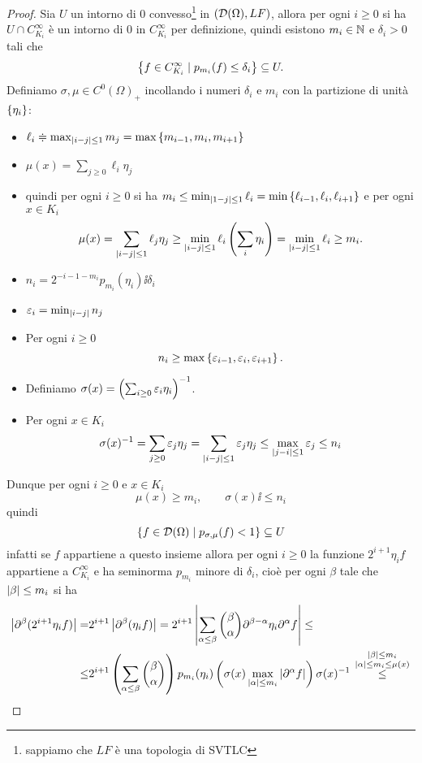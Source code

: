\begin{proof}
Sia $U$ un intorno di $0$ convesso\footnote{sappiamo che $LF$ \`e una topologia di SVTLC} in $(\mathcal{D}(\Omega),LF)$, allora per ogni $i\geq 0$ si ha $U\cap C_{K_i}^\infty$ \`e un intorno di $0$ in $C^\infty_{K_i}$ per definizione, quindi esistono $m_i\in\mathbb{N}$ e $\delta_i>0$ tali che
\[\left\{{f\in C^\infty_{K_i}\mid p_{m_i}(f)\leq \delta_i}\right\}\subseteq U.\]
Definiamo $\sigma,\mu\in C^0(\Omega)_+$ incollando i numeri $\delta_i$ e $m_i$ con la partizione di unit\`a $\left\{{\eta_i}\right\}$:
\begin{itemize}
    \item $\ell_i\doteqdot \max_{\left|{i-j}\right|\leq 1}m_j=\max\left\{{m_{i-1},m_i,m_{i+1}}\right\}$
    \item $\mu(x)=\sum_{j\geq 0}\ell_i\eta_j$
    \item quindi per ogni $i\geq 0$ si ha $m_i\leq \min_{\left|{1-j}\right|\leq 1}\ell_i=\min\left\{{\ell_{i-1},\ell_i,\ell_{i+1}}\right\}$ e per ogni $x\in K_i$
\[\mu(x)=\sum_{\left|{i-j}\right|\leq 1}\ell_j\eta_j\geq \min_{\left|{i-j}\right|\leq 1}\ell_i\left({\sum_i\eta_i}\right)=\min_{\left|{i-j}\right|\leq 1}\ell_i\geq m_i.\]
\end{itemize}
\begin{itemize}
    \item $n_i=2^{-i-1-m_i}p_{m_i}(\eta_i)\ii\delta_i$
    \item $\varepsilon_i=\min_{\left|{i-j}\right|}n_j$
    \item Per ogni $i\geq 0$
\[n_i\geq \max\left\{{\varepsilon_{i-1},\varepsilon_i,\varepsilon_{i+1}}\right\}.\]
\item Definiamo $\sigma(x)=\left({\sum_{i\geq 0}\varepsilon_i\eta_i}\right)^{-1}$.
\item Per ogni $x\in K_i$
\[\sigma(x)^{-1}=\sum_{j\geq 0}\varepsilon_j\eta_j=\sum_{\left|{i-j}\right|\leq 1}\varepsilon_j\eta_j\leq\max_{\left|{j-i}\right|\leq 1}\varepsilon_j\leq n_i\]
\end{itemize}
Dunque per ogni $i\geq 0$ e $x\in K_i$
\[\mu(x)\geq m_i,\qquad \sigma(x)\ii\leq n_i\]
quindi 
\[\left\{{f\in\mathcal{D}(\Omega)\mid p_{\sigma,\mu}(f)<1}\right\}\subseteq U\]
infatti se $f$ appartiene a questo insieme allora per ogni $i\geq 0$ la funzione $2^{i+1}\eta_i f$ appartiene a $C^\infty_{K_i}$ e ha seminorma $p_{m_i}$ minore di $\delta_i$, cio\`e per ogni $\beta$ tale che $\left|{\beta}\right|\leq m_i$ si ha
\begin{align*}
    \abs{\del^\beta(2^{i+1}\eta_i f)}=&2^{i+1}\abs{\del^\beta(\eta_i f)}=2^{i+1}\abs{\sum_{\al\leq \beta}\binom\beta\al\del^{\beta-\al}\eta_i\del^\al f}\leq\\
    \leq&2^{i+1}\pa{\sum_{\al\leq \beta}\binom\beta\al}p_{m_i}(\eta_i)\pa{\sigma(x)\max_{\abs\al\leq m_i}\abs{\del^\al f} }\sigma(x)\ii\pasgnlmath\leq{\smat{\abs{\beta}\leq m_i\\\abs\al\leq m_i\leq \mu(x)}}\\

\end{align*}
\end{proof}
